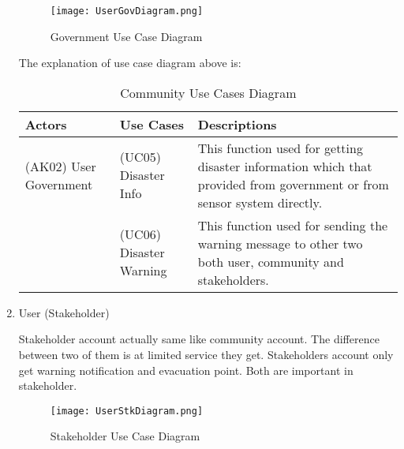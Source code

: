\begin{enumerate}
\begin{figure}[H]
\centering
\texttt{[image: UserGovDiagram.png]}
\label{fig:govUseCase}
\caption{Government Use Case Diagram}
\end{figure}

The explanation of use case  diagram above is:
\begin{table}[H]
\begin{center}
\caption{Community Use Cases Diagram}
\label{tab: ComUCDiagram}
	\vspace{0.1cm}
\begin{tabular}{ |>{\centering\arraybackslash}m{2cm}|>{\centering\arraybackslash}m{4cm}|>{\centering\arraybackslash}m{6.5cm}|}
 \hline
 \textbf{Actors} & \textbf{Use Cases} & \textbf{Descriptions} \\
 \hline \hline
  (AK02) User Government & (UC05) Disaster Info & This function used for getting disaster information which that provided from government or from sensor system directly. \\
 \hline 
 & (UC06) Disaster Warning & This function used for sending the warning message to other two both user, community and stakeholders. \\
 \hline 
\end{tabular}
\end{center}
\end{table}

\item User (Stakeholder)\par 
Stakeholder account actually same like community account. The difference between two of them is at limited service they get. Stakeholders account only get warning notification and evacuation point. Both are important in stakeholder.
\begin{figure}[H]
\centering
\texttt{[image: UserStkDiagram.png]}
\label{fig:stkUseCase}
\caption{Stakeholder Use Case Diagram}
\end{figure}


\end{enumerate}

